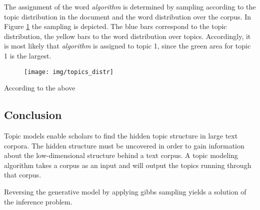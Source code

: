 \documentclass[a4paper,ngerman]{atseminar}
\begin{document}
\begin{example}
The assignment of the word \textit{algorithm} is determined by sampling according
to the topic distribution in the document and the word distribution over the corpus.
In Figure \ref{fig:topics_distr} the sampling is depicted. The blue bars correspond to 
the topic distribution, the yellow bars to the word distribution over topics.
Accordingly, it is most likely that \textit{algorithm} is assigned to topic 1, since the green 
area for topic 1 is the largest.

\begin{figure}[H]
\centering
\texttt{[image: img/topics\_distr]}
 \caption{}
  \label{fig:topics_distr}
\end{figure}

According to the above 

\end{example}





\subsection{Conclusion}

Topic models enable scholars to find the hidden topic structure in large text 
corpora. The hidden structure must be uncovered in order to gain information 
about the low-dimensional structure behind a text corpus.
A topic modeling algorithm takes a corpus as an input and will output the topics
running through that corpus.

Reversing the generative model by applying gibbs sampling yields a solution of 
the inference problem.
















\end{document}
